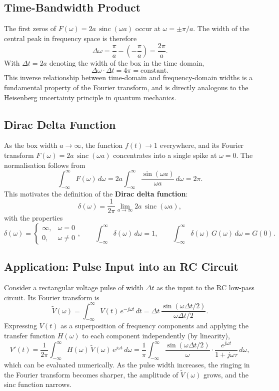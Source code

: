 \documentclass{article}
\begin{document}
\subsection{Time-Bandwidth Product}

The first zeros of $F(\omega) = 2a\,\operatorname{sinc}(\omega a)$ occur at $\omega = \pm\pi/a$. The width of the central peak in frequency space is therefore
\[\Delta\omega = \frac{\pi}{a} - \left(-\frac{\pi}{a}\right) = \frac{2\pi}{a}.\]
With $\Delta t = 2a$ denoting the width of the box in the time domain,
\[\Delta\omega \cdot \Delta t = 4\pi = \text{constant}.\]
This inverse relationship between time-domain and frequency-domain widths is a fundamental property of the Fourier transform, and is directly analogous to the Heisenberg uncertainty principle in quantum mechanics.

\subsection{Dirac Delta Function}

As the box width $a \to \infty$, the function $f(t) \to 1$ everywhere, and its Fourier transform $F(\omega) = 2a\,\operatorname{sinc}(\omega a)$ concentrates into a single spike at $\omega = 0$. The normalisation follows from
\[\int_{-\infty}^{\infty} F(\omega)\,d\omega = 2a\int_{-\infty}^{\infty} \frac{\sin(\omega a)}{\omega a}\,d\omega = 2\pi.\]
This motivates the definition of the \textbf{Dirac delta function}:
\[\delta(\omega) = \frac{1}{2\pi}\lim_{a \to \infty} 2a\,\operatorname{sinc}(\omega a),\]
with the properties
\[\delta(\omega) = \begin{cases} \infty, & \omega = 0 \\ 0, & \omega \neq 0 \end{cases}, \qquad \int_{-\infty}^{\infty} \delta(\omega)\,d\omega = 1, \qquad \int_{-\infty}^{\infty} \delta(\omega)\,G(\omega)\,d\omega = G(0).\]

\subsection{Application: Pulse Input into an RC Circuit}

Consider a rectangular voltage pulse of width $\Delta t$ as the input to the RC low-pass circuit. Its Fourier transform is
\[\tilde{V}(\omega) = \int_{-\infty}^{\infty} V(t)\,e^{-j\omega t}\,dt = \Delta t\,\frac{\sin\!\left(\omega\Delta t/2\right)}{\omega\Delta t/2}.\]
Expressing $V(t)$ as a superposition of frequency components and applying the transfer function $H(\omega)$ to each component independently (by linearity),
\[V'(t) = \frac{1}{2\pi}\int_{-\infty}^{\infty} H(\omega)\,\tilde{V}(\omega)\,e^{j\omega t}\,d\omega = \frac{1}{\pi}\int_{-\infty}^{\infty} \frac{\sin(\omega\Delta t/2)}{\omega}\cdot\frac{e^{j\omega t}}{1 + j\omega\tau}\,d\omega,\]
which can be evaluated numerically. As the pulse width increases, the ringing in the Fourier transform becomes sharper, the amplitude of $\tilde{V}(\omega)$ grows, and the sinc function narrows.
\end{document}

